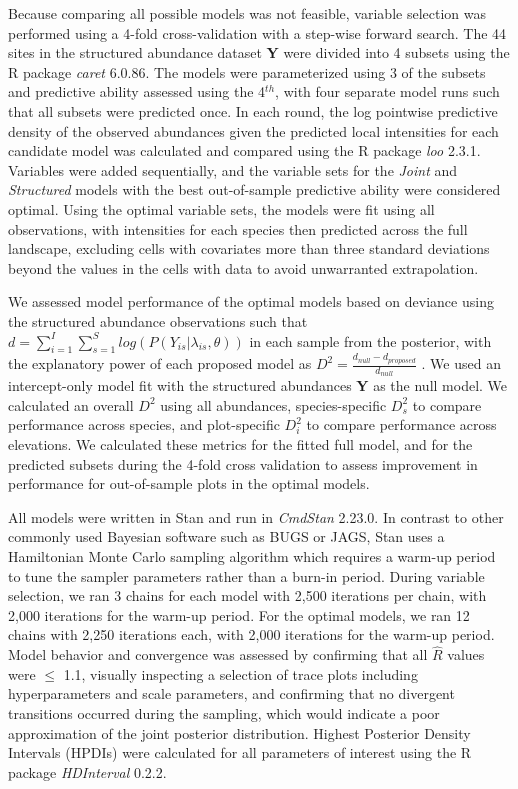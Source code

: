 \documentclass[preprint,final,times,12pt,3p]{elsarticle}
\begin{document}
Because comparing all possible models was not feasible, variable selection was performed using a 4-fold cross-validation with a step-wise forward search. The 44 sites in the structured abundance dataset \textbf{Y} were divided into 4 subsets using the R package \emph{caret} 6.0.86. The models were parameterized using 3 of the subsets and predictive ability assessed using the 4$^{th}$, with four separate model runs such that all subsets were predicted once. In each round, the log pointwise predictive density of the observed abundances given the predicted local intensities for each candidate model was calculated and compared using the R package \emph{loo} 2.3.1. Variables were added sequentially, and the variable sets for the \emph{Joint} and \emph{Structured} models with the best out-of-sample predictive ability were considered optimal. Using the optimal variable sets, the models were fit using all observations, with intensities for each species then predicted across the full landscape, excluding cells with covariates more than three standard deviations beyond the values in the cells with data to avoid unwarranted extrapolation.

We assessed model performance of the optimal models based on deviance using the structured abundance observations such that $d = \sum_{i=1}^{I}\sum_{s=1}^S log(P(Y_{is} | \lambda_{is}, \theta))$ in each sample from the posterior, with the explanatory power of each proposed model as $D^2 = \frac{d_{null} - d_{proposed}}{d_{null}}$ \citep{Caradima2019,Guisan2000}. We used an intercept-only model fit with the structured abundances \textbf{Y} as the null model. We calculated an overall $D^2$ using all abundances, species-specific $D^2_s$ to compare performance across species, and plot-specific $D^2_i$ to compare performance across elevations. We calculated these metrics for the fitted full model, and for the predicted subsets during the 4-fold cross validation to assess improvement in performance for out-of-sample plots in the optimal models.

All models were written in Stan \citep{Carpenter2017} and run in \emph{CmdStan} 2.23.0. In contrast to other commonly used Bayesian software such as BUGS or JAGS, Stan uses a Hamiltonian Monte Carlo sampling algorithm which requires a warm-up period to tune the sampler parameters rather than a burn-in period. During variable selection, we ran 3 chains for each model with 2,500 iterations per chain, with 2,000 iterations for the warm-up period. For the optimal models, we ran 12 chains with 2,250 iterations each, with 2,000 iterations for the warm-up period. Model behavior and convergence was assessed by confirming that all $\hat{R}$ values were $\leq$ 1.1, visually inspecting a selection of trace plots including hyperparameters and scale parameters, and confirming that no divergent transitions occurred during the sampling, which would indicate a poor approximation of the joint posterior distribution. Highest Posterior Density Intervals (HPDIs) were calculated for all parameters of interest using the R package \emph{HDInterval} 0.2.2.
\end{document}
